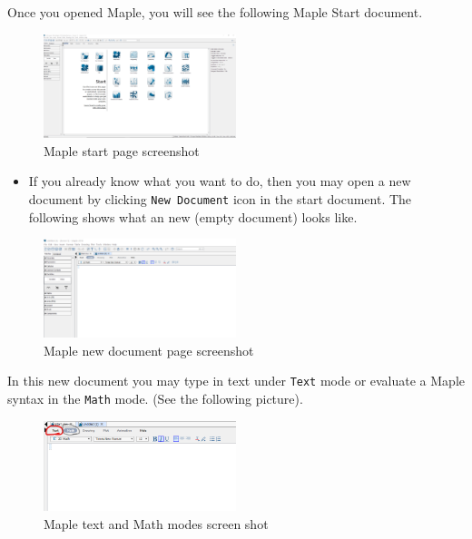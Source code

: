 \documentclass[
  en,11pt,simple]{elegantbook}
\begin{document}
Once you opened Maple, you will see the following Maple Start document.

\begin{figure}
\centering
\includegraphics[width=0.5\textwidth,height=\textheight]{figs/Maple-Start.png}
\caption{Maple start page screenshot}
\end{figure}

\begin{itemize}

\item
  If you already know what you want to do, then you may open a new document by clicking \texttt{New\ Document} icon in the start document. The following shows what an new (empty document) looks like.
\end{itemize}

\begin{figure}
\centering
\includegraphics[width=0.5\textwidth,height=\textheight]{figs/Maple-New-Doc.png}
\caption{Maple new document page screenshot}
\end{figure}

In this new document you may type in text under \texttt{Text} mode or evaluate a Maple syntax in the \texttt{Math} mode. (See the following picture).

\begin{figure}
\centering
\includegraphics[width=0.5\textwidth,height=\textheight]{figs/Text-Math-Mode.png}
\caption{Maple text and Math modes screen shot}
\end{figure}
\end{document}
